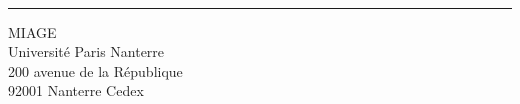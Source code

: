 \documentclass[a4paper,12pt]{book}
\theoremstyle{break}
\begin{document}
\\
\noindent\rule[2pt]{\textwidth}{0.5pt}
\begin{center}
  MIAGE\\
  Université Paris Nanterre\\
  200 avenue de la République\\
  92001 Nanterre Cedex
\end{center}
\vspace*{\fill}
\end{document}
